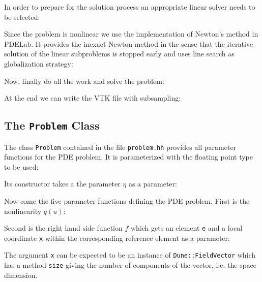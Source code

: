 \documentclass[a4paper,12pt]{article}
\begin{document}
In order to prepare for the solution process an appropriate 
linear solver needs to be selected:


Since the problem is nonlinear we use the implementation of
Newton's method in PDELab. It provides the inexact Newton method
in the sense that the iterative solution of the linear subproblems is
stopped early and uses line search as globalization strategy:


Now, finally do all the work and solve the problem:


At the end we can write the VTK file with subsampling:


\subsection{The \lstinline{Problem} Class}

The class \lstinline{Problem} contained in the file \lstinline{problem.hh}
provides all parameter functions for the PDE problem. It is parameterized
with the floating point type to be used:

Its constructor takes a the parameter $\eta$ as a parameter:

Now come the five parameter functions defining the PDE problem.
First is the nonlinearity $q(u)$:

Second is the right hand side function $f$ which gets 
an element \lstinline{e} and a local coordinate \lstinline{x} within
the corresponding reference element as a parameter:

The argument \lstinline{x} can be expected to be an instance
of \lstinline{Dune::FieldVector} which has a method \lstinline{size}
giving the number of components of the vector, i.e. the space dimension.
\end{document}
